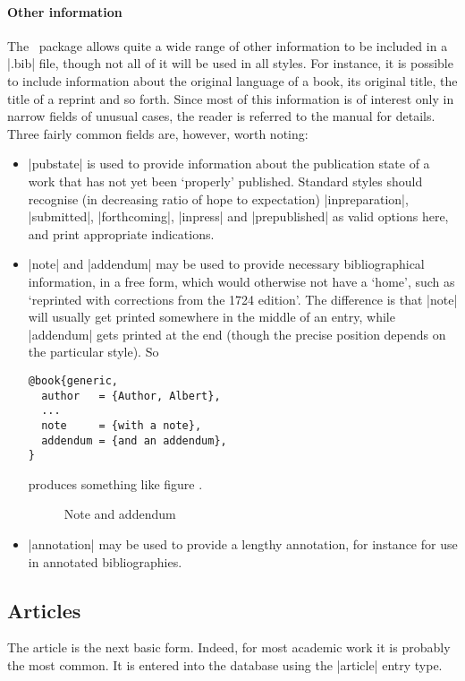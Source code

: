 {\paragraph{Other information} The \biblatex\ package allows quite a wide range of other information to be included in a |.bib| file, though not all of it will be used in all styles. For instance, it is possible to include information about the original language of a book, its original title, the title of a reprint and so forth. Since most of this information is of interest only in narrow fields of unusual cases, the reader is referred to the manual for details. Three fairly common fields are, however, worth noting:
\begin{itemize}
\item |pubstate| is used to provide information about the publication state of a work that has not yet been `properly' published. Standard styles should recognise (in decreasing ratio of hope to expectation) |inpreparation|, |submitted|, |forthcoming|, |inpress| and |prepublished| as valid options here, and print appropriate indications.
\item |note| and |addendum| may be used to provide necessary bibliographical information, in a free form, which would otherwise not have a `home', such as `reprinted with corrections from the 1724 edition'. The difference is that |note| will usually get printed somewhere in the middle of an entry, while |addendum| gets printed at the end (though the precise position depends on the particular style). So
\begin{verbatim}
@book{generic,
  author   = {Author, Albert},
  ...
  note     = {with a note},
  addendum = {and an addendum},
}
\end{verbatim}
produces something like figure \label{addendum}.

\begin{figure}
\caption{Note and addendum\label{addendum}}
\end{figure}
\item |annotation| may be used to provide a lengthy annotation, for instance for use in annotated bibliographies.
\end{itemize}

\subsection{Articles}

The article is the next basic form. Indeed, for most academic work it is probably the most common. It is entered into the database using the |article| entry type.

}
